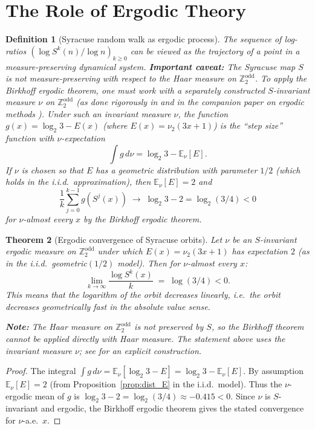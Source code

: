 \documentclass[12pt,a4paper]{article}
\newtheorem{theorem}{Theorem}[section]
\newtheorem{definition}[theorem]{Definition}
\begin{document}
\section{The Role of Ergodic Theory}

\begin{definition}[Syracuse random walk as ergodic process]\label{def:ergodic_rw}
The sequence of log-ratios $(\log S^k(n) / \log n)_{k \geq 0}$ can be viewed as the
trajectory of a point in a measure-preserving dynamical system.
\textbf{Important caveat:} The Syracuse map $S$ is \emph{not} measure-preserving
with respect to the Haar measure on $\mathbb{Z}_2^{\text{odd}}$.
To apply the Birkhoff ergodic theorem, one must work with a separately constructed
$S$-invariant measure $\nu$ on $\mathbb{Z}_2^{\text{odd}}$ (as done rigorously in
\cite{Tao2022} and in the companion paper on ergodic methods \cite{Kontorovich2010}).
Under such an invariant measure $\nu$, the function
$g(x) = \log_2 3 - E(x)$ (where $E(x) = \nu_2(3x+1)$) is the ``step size''
function with $\nu$-expectation
\[
  \int g\, d\nu = \log_2 3 - \mathbb{E}_\nu[E].
\]
If $\nu$ is chosen so that $E$ has a geometric distribution with parameter $1/2$
(which holds in the i.i.d.\ approximation), then $\mathbb{E}_\nu[E] = 2$ and
\[
  \frac{1}{k} \sum_{j=0}^{k-1} g(S^j(x)) \;\longrightarrow\; \log_2 3 - 2 = \log_2(3/4) < 0
\]
for $\nu$-almost every $x$ by the Birkhoff ergodic theorem.
\end{definition}

\begin{theorem}[Ergodic convergence of Syracuse orbits]\label{thm:ergodic_conv}
Let $\nu$ be an $S$-invariant ergodic measure on $\mathbb{Z}_2^{\text{odd}}$ under which
$E(x) = \nu_2(3x+1)$ has expectation $2$ (as in the i.i.d.\ geometric$(1/2)$ model).
Then for $\nu$-almost every $x$:
\[
  \lim_{k \to \infty} \frac{\log S^k(x)}{k} \;=\; \log(3/4) < 0.
\]
This means that the logarithm of the orbit decreases linearly, i.e.\ the orbit decreases
\emph{geometrically fast} in the absolute value sense.

\textbf{Note:} The Haar measure on $\mathbb{Z}_2^{\text{odd}}$ is \emph{not} preserved
by $S$, so the Birkhoff theorem cannot be applied directly with Haar measure.
The statement above uses the invariant measure $\nu$; see \cite{Kontorovich2010}
for an explicit construction.
\end{theorem}

\begin{proof}
The integral $\int g\, d\nu = \mathbb{E}_\nu[\log_2 3 - E] = \log_2 3 - \mathbb{E}_\nu[E]$.
By assumption $\mathbb{E}_\nu[E] = 2$
(from Proposition~\ref{prop:dist_E} in the i.i.d.\ model).
Thus the $\nu$-ergodic mean of $g$ is $\log_2 3 - 2 = \log_2(3/4) \approx -0.415 < 0$.
Since $\nu$ is $S$-invariant and ergodic, the Birkhoff ergodic theorem gives the stated
convergence for $\nu$-a.e.\ $x$.
\end{proof}
\end{document}
